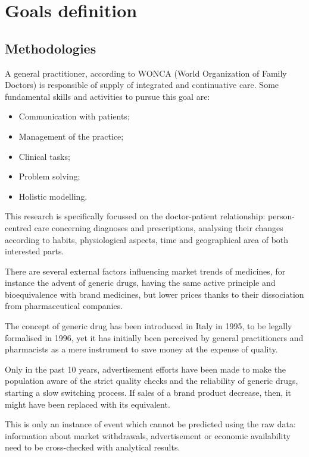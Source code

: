 \chapter{Goals definition} 
\section{Methodologies}
A general practitioner, according to WONCA (World Organization of Family Doctors)  is responsible of supply of integrated and continuative care. Some fundamental skills and activities\cite{wonka} to pursue this goal are:
\begin{itemize}
	\item Communication with patients;
	\item Management of the practice;
	\item Clinical tasks;
	\item Problem solving;
	\item Holistic modelling.
\end{itemize}

This research is specifically focussed on the doctor-patient relationship: person-centred care concerning diagnoses and prescriptions, analysing their changes according to habits, physiological aspects, time and geographical area of both interested parts. 

There are several external factors influencing market trends of medicines, for instance the advent of generic drugs, having the same active principle and bioequivalence with brand medicines, but lower prices thanks to their dissociation from pharmaceutical companies.

The concept of generic drug has been introduced in Italy in 1995, to be legally formalised in 1996\cite{generico}, yet it has initially been perceived by general practitioners and pharmacists as a mere instrument to save money at the expense of quality\cite{medicinaliequivalenti}.

Only in the past 10 years, advertisement efforts have been made to make the population aware of the strict quality checks and the reliability of generic drugs, starting a slow switching process. If sales of a brand product decrease, then, it might have been replaced with its equivalent.

This is only an instance of event which cannot be predicted using the raw data: information about market withdrawals, advertisement or economic availability need to be cross-checked with analytical results.

